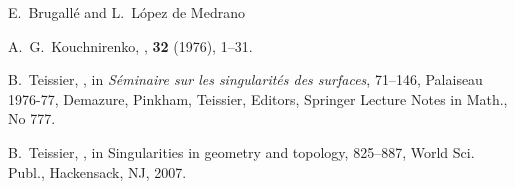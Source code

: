 \documentclass[oneside]{amsart}
\theoremstyle{definition}
\begin{document}
\begin{thebibliography}{bla}	

	 E.~Brugall\'e and L.~L\'opez de Medrano 
		
	A.~G.~Kouchnirenko,
	,
	 {\bf 32} (1976), 1--31.
	
	B.~Teissier,
	,
	\newblock in {\em S\'eminaire sur les singularit\'es des surfaces}, 71--146, Palaiseau 1976-77, Demazure, Pinkham, Teissier, Editors, Springer Lecture Notes in Math., No 777.
	
	B.~Teissier,
	,
	\newblock in {Singularities in geometry and topology},  825--887, World Sci. Publ., Hackensack, NJ, 2007. 
		
\end{thebibliography}
\end{document}
